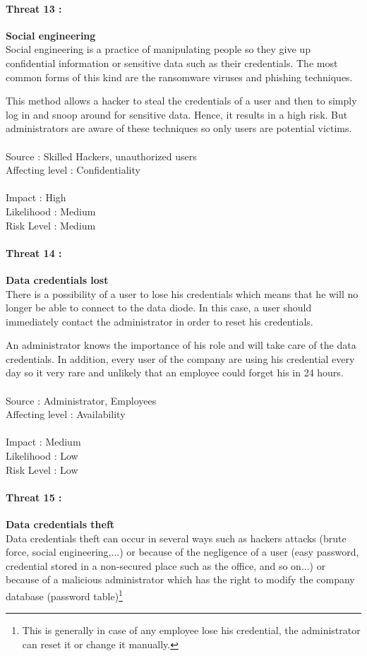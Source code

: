 \documentclass[a4paper,10pt]{article}
\begin{document}
\paragraph{Threat 13 :} \textbf{Social engineering} \\
\indent Social engineering is a practice of manipulating people so they give up confidential information or sensitive data such as their credentials. The most common forms of this kind are the ransomware viruses and phishing techniques. 

This method allows a hacker to steal the credentials of a user and then to simply log in and snoop around for sensitive data. Hence, it results in a high risk. But administrators are aware of these techniques so only users are potential victims. \\ \\ 
Source : Skilled Hackers, unauthorized users \\
Affecting level : Confidentiality  \\ \\
Impact : High \\
Likelihood : Medium \\
Risk Level : Medium

\paragraph{Threat 14 :} \textbf{Data credentials lost} \\
\indent There is a possibility of a user to lose his credentials which means that he will no longer be able to connect to the data diode. In this case, a user should immediately contact the administrator in order to reset his credentials.

An administrator knows the importance of his role and will take care of the data credentials. In addition, every user of the company are using his credential every day so it very rare and unlikely that an employee could forget his in 24 hours. \\  \\ 
Source : Administrator, Employees  \\
Affecting level : Availability \\ \\
Impact : Medium \\
Likelihood : Low \\
Risk Level : Low

\paragraph{Threat 15 :} \textbf{Data credentials theft} \\
\indent Data credentials theft can occur in several ways such as hackers attacks (brute force, social engineering,...)  or because of the negligence of a user (easy password, credential stored in a non-secured place such as the office, and so on...) or because of a malicious administrator which has the right to modify the company database (password table)\footnote{This is generally in case of any employee lose his credential, the administrator can reset it or change it manually.}
\end{document}
